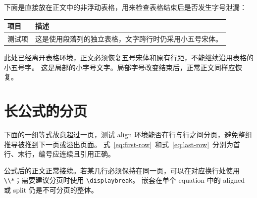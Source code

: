 \documentclass[degree-type=professional,bibliography=none]{gzuthesis}
\begin{document}
下面是直接放在正文中的非浮动表格，用来检查表格结束后是否发生字号泄漏：
\par\medskip
\noindent\begin{tabular}{lp{.65\linewidth}}
  \toprule 项目 & 描述 \\ \midrule
  测试项 & 这是使用段落列的独立表格，文字跨行时仍采用小五号宋体。 \\
  \bottomrule
\end{tabular}
\par\medskip
此处已经离开表格环境，正文必须恢复五号宋体和原有行距，不能继续沿用表格的小五号字。
{\small 这是局部的小字号文字。}局部字号改变结束后，正常正文同样应恢复。

\chapter{长公式的分页}
下面的一组等式故意超过一页，测试 align 环境能否在行与行之间分页，避免整组推导被推到下一页或溢出页面。
式~\eqref{eq:first-row}~和式~\eqref{eq:last-row}~分别为首行、末行，编号应连续且引用正确。

公式后的正文正常接续。若某几行必须保持在同一页，可以在对应换行处使用 \verb|\\*|；需要建议分页时使用 \verb|\displaybreak|。
嵌套在单个 equation 中的 aligned 或 split 仍是不可分页的整体。
\end{document}
